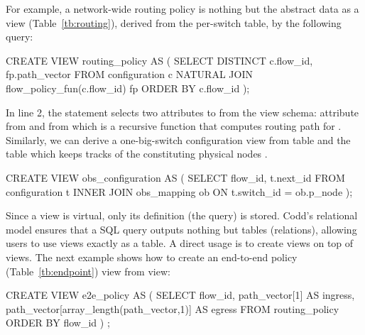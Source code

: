 For example, a network-wide routing policy is nothing but the abstract
data as a view (Table~\ref{tb:routing}), derived from the per-switch
 table, by the following query:
\begin{sql}
CREATE VIEW routing_policy AS (
  SELECT DISTINCT c.flow_id, fp.path_vector
  FROM configuration c 
       NATURAL JOIN flow_policy_fun(c.flow_id) fp
  ORDER BY c.flow_id );  
\end{sql}
In line 2, the  statement selects two attributes to from
the view schema: attribute  from  and
 from  which is a recursive
function that computes routing path for . 
Similarly, we can derive a one-big-switch configuration view from
 table and the  table which keeps
tracks of the constituting physical nodes .
\begin{sql}
CREATE VIEW obs_configuration AS (
  SELECT flow_id, t.next_id
  FROM   configuration t INNER JOIN obs_mapping ob
  ON     t.switch_id = ob.p_node );  
\end{sql}

Since a view is virtual, only its definition (the query) is stored.
Codd's relational model ensures that a SQL query outputs nothing but tables
(relations), allowing users to use views exactly as a table. A direct
usage is to create views on top of views. The next example shows how to
create an end-to-end policy (Table~\ref{tb:endpoint}) view from
 view:
\begin{sql}
CREATE VIEW e2e_policy AS (
 SELECT flow_id,
       path_vector[1] AS ingress,
       path_vector[array_length(path_vector,1)] AS egress
 FROM  routing_policy
 ORDER BY flow_id ) ;  
\end{sql}

